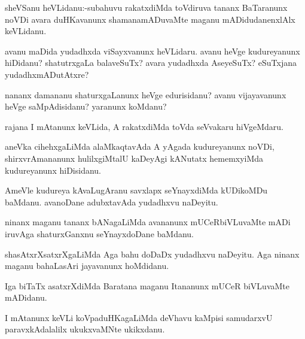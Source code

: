 \documentclass{article}
\begin{document}

\begin{mn}%
sheVSanu heVLidanu:-subahuvu rakatxdiMda toVdiruva tananx BaTaranunx noVDi avara duHKavanunx 
shamanamADuvaMte maganu mADidudanenxlAlx keVLidanu.
\end{mn}

\begin{mn}%
avanu  maDida yudadhxda viSayxvanunx heVLidaru. avanu heVge kudureyanunx hiDidanu? 
shatutrxgaLa balaveSuTx? avara yudadhxda AseyeSuTx? eSuTxjana yudadhxmADutAtxre?
\end{mn}

\begin{mn}%
nananx damananu shaturxgaLanunx heVge edurisidanu? avanu vijayavanunx heVge saMpAdisidanu? 
yaranunx koMdanu?
\end{mn}

\begin{mn}%
rajana I mAtanunx keVLida, A rakatxdiMda toVda seVvakaru hiVgeMdaru.
\end{mn}

\begin{mn}%
aneVka cihehxgaLiMda alaMkaqtavAda A yAgada kudureyanunx noVDi, shirxvrAmananunx 
hulilxgiMtalU kaDeyAgi kANutatx hememxyiMda kudureyanunx hiDisidanu.
\end{mn}

\begin{mn}%
AmeVle kudureya kAvaLugAranu savxlapx seYnayxdiMda kUDikoMDu baMdanu. avanoDane adubxtavAda 
yudadhxvu naDeyitu.
\end{mn}

\begin{mn}%
ninanx maganu tananx bANagaLiMda avananunx mUCeRbiVLuvaMte mADi iruvAga shaturxGanxnu 
seYnayxdoDane baMdanu.
\end{mn}

\begin{mn}%
shasAtxrXsatxrXgaLiMda Aga bahu doDaDx yudadhxvu naDeyitu. Aga ninanx maganu bahaLasAri 
jayavanunx hoMdidanu.
\end{mn}

\begin{mn}%
Iga biTaTx asatxrXdiMda Baratana maganu Itananunx mUCeR biVLuvaMte mADidanu.
\end{mn}

\begin{mn}%
I mAtanunx keVLi koVpaduHKagaLiMda deVhavu kaMpisi samudarxvU paravxkAdalalilx ukukxvaMNte 
ukikxdanu.
\end{mn}
\end{document}

